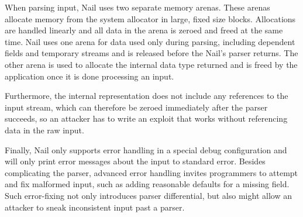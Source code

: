 When parsing input, Nail uses two separate memory arenas. These arenas allocate memory from the
system allocator in large, fixed size blocks. Allocations are handled linearly and all data in the
arena is zeroed and freed at the same time. Nail uses one arena for data used only during parsing,
including dependent fields and temporary streams and is released before the Nail's parser returns.
The other arena is used to allocate the internal data type returned and is freed by the application
once it is done processing an input. 

Furthermore, the internal representation does not include any references to the input stream, which
can therefore be zeroed immediately after the parser succeeds, so an attacker has to write an
exploit that works without referencing data in the raw input.

Finally, Nail only supports error handling in a special debug configuration and will only print
error messages about the input to standard error. Besides complicating the parser, advanced error handling
invites programmers to attempt and fix malformed input, such as adding reasonable defaults for a
missing field. Such error-fixing not only introduces parser differential, but also might allow an
attacker to sneak inconsistent input past a parser.



